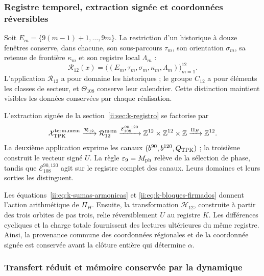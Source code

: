 \subsubsection{Registre temporel, extraction signée et coordonnées réversibles}

Soit \(E_m=\{9(m-1)+1,\ldots,9m\}\). La restriction d'un historique à douze fenêtres conserve, dans chacune, son sous-parcours \(\tau_m\), son orientation \(\sigma_m\), sa retenue de frontière \(\kappa_m\) et son registre local \(\Lambda_m\) :
\[
 \mathcal R_{12}(x)
 =\bigl((E_m,\tau_m,\sigma_m,\kappa_m,\Lambda_m)\bigr)_{m=1}^{12}.
\]
L'application \(\mathcal R_{12}\) a pour domaine les historiques ; le groupe \(C_{12}\) a pour éléments les classes de secteur, et \(\Theta_{108}\) conserve leur calendrier. Cette distinction maintient visibles les données conservées par chaque réalisation.

L'extraction signée de la section~\ref{ii:sec:k-registro} se factorise par
\begin{equation}
 \mathcal X_{\rm TPK}^{\rm term,mem}
 \xrightarrow{\mathcal R_{12}}\mathcal R_{12}^{\rm mem}
 \xrightarrow{\mathcal E_{108}^{90,120}}
 \mathbb Z^{12}\times\mathbb Z^{12}\times\mathbb Z
 \xrightarrow{\Pi_H}\mathbb Z^{12}.
 \label{ii:ii:tpk-extraccion-tipada}
\end{equation}
La deuxième application exprime les canaux \((b^{90},b^{120},Q_{\rm TPK})\) ; la troisième construit le vecteur signé \(U\). La règle \(\varepsilon_9=M_{\rm ph}\) relève de la sélection de phase, tandis que \(\mathcal E_{108}^{90,120}\) agit sur le registre complet des canaux. Leurs domaines et leurs sorties les distinguent.

Les équations~\eqref{ii:eq:k-sumas-armonicas} et \eqref{ii:eq:k-bloques-firmados} donnent l'action arithmétique de \(\Pi_H\). Ensuite, la transformation \(\mathcal H_{12}\), construite à partir des trois orbites de pas trois, relie réversiblement \(U\) au registre \(K\). Les différences cycliques et la charge totale fournissent des lectures ultérieures du même registre. Ainsi, la provenance commune des coordonnées régionales et de la coordonnée signée est conservée avant la clôture entière qui détermine \(\alpha\).

\subsubsection{Transfert réduit et mémoire conservée par la dynamique}

